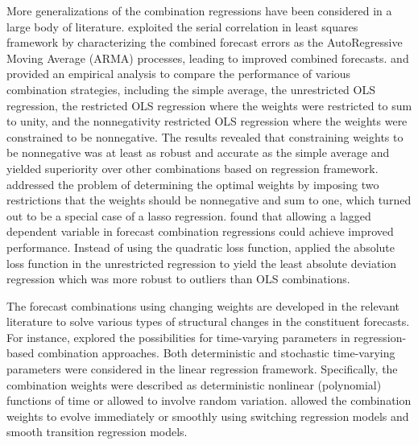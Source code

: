 \documentclass[11pt]{article}
\begin{document}
More generalizations of the combination regressions have been considered in a large body of literature. \cite{Diebold1988-sx} exploited the serial correlation in least squares framework by characterizing the combined forecast errors as the AutoRegressive Moving Average (ARMA) processes, leading to improved combined forecasts. \cite{Gunter1992-go} and \cite{Aksu1992-lb} provided an empirical analysis to compare the performance of various combination strategies, including the simple average, the unrestricted OLS regression, the restricted OLS regression where the weights were restricted to sum to unity, and the nonnegativity restricted OLS regression where the weights were constrained to be nonnegative. The results revealed that constraining weights to be nonnegative was at least as robust and accurate as the simple average and yielded superiority over other combinations based on regression framework. \cite{Conflitti2015-fq} addressed the problem of determining the optimal weights by imposing two restrictions that the weights should be nonnegative and sum to one, which turned out to be a special case of a lasso regression. \cite{Edward_Coulson1993-db} found that allowing a lagged dependent variable in forecast combination regressions could achieve improved performance. Instead of using the quadratic loss function, \cite{Nowotarski2014-ev} applied the absolute loss function in the unrestricted regression to yield the least absolute deviation regression which was more robust to outliers than OLS combinations.

The forecast combinations using changing weights are developed in the relevant literature to solve various types of structural changes in the constituent forecasts. For instance, \cite{Diebold1987-go} explored the possibilities for time-varying parameters in regression-based combination approaches. Both deterministic and stochastic time-varying parameters were considered in the linear regression framework. Specifically, the combination weights were described as deterministic nonlinear (polynomial) functions of time or allowed to involve random variation. \cite{Deutsch1994-ob} allowed the combination weights to evolve immediately or smoothly using switching regression models and smooth transition regression models.
\end{document}
